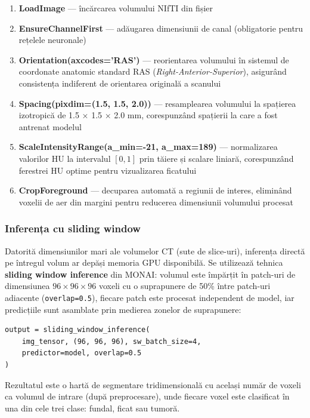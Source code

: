 \documentclass[12pt, a4paper]{report}
\begin{document}
\begin{enumerate}
    \item \textbf{LoadImage} --- încărcarea volumului NIfTI din fișier
    \item \textbf{EnsureChannelFirst} --- adăugarea dimensiunii de canal
          (obligatorie pentru rețelele neuronale)
    \item \textbf{Orientation(axcodes='RAS')} --- reorientarea volumului în
          sistemul de coordonate anatomic standard RAS
          (\textit{Right-Anterior-Superior}), asigurând consistența indiferent
          de orientarea originală a scanului
    \item \textbf{Spacing(pixdim=(1.5, 1.5, 2.0))} --- resamplearea volumului
          la spațierea izotropică de 1.5 × 1.5 × 2.0 mm, corespunzând
          spațierii la care a fost antrenat modelul
    \item \textbf{ScaleIntensityRange(a\_min=-21, a\_max=189)} --- normalizarea
          valorilor HU la intervalul $[0, 1]$ prin tăiere și scalare liniară,
          corespunzând ferestrei HU optime pentru vizualizarea ficatului
    \item \textbf{CropForeground} --- decuparea automată a regiunii de interes,
          eliminând voxelii de aer din margini pentru reducerea dimensiunii
          volumului procesat
\end{enumerate}

\subsubsection{Inferența cu sliding window}

Datorită dimensiunilor mari ale volumelor CT (sute de slice-uri), inferența
directă pe întregul volum ar depăși memoria GPU disponibilă. Se utilizează
tehnica \textbf{sliding window inference} din MONAI: volumul este împărțit în
patch-uri de dimensiunea $96 \times 96 \times 96$ voxeli cu o suprapunere de
50\% între patch-uri adiacente (\texttt{overlap=0.5}), fiecare patch este
procesat independent de model, iar predicțiile sunt asamblate prin medierea
zonelor de suprapunere:

\begin{verbatim}
output = sliding_window_inference(
    img_tensor, (96, 96, 96), sw_batch_size=4,
    predictor=model, overlap=0.5
)
\end{verbatim}

Rezultatul este o hartă de segmentare tridimensională cu același număr de voxeli
ca volumul de intrare (după preprocesare), unde fiecare voxel este clasificat în
una din cele trei clase: fundal, ficat sau tumoră.
\end{document}
